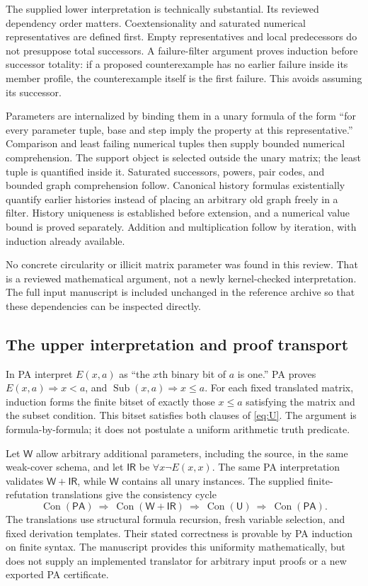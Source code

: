 \documentclass[11pt,a4paper]{article}
\theoremstyle{definition}
\newcommand{\PA}{\mathsf{PA}}
\newcommand{\U}{\mathsf{U}}
\newcommand{\W}{\mathsf{W}}
\newcommand{\IR}{\mathsf{IR}}
\newcommand{\Con}{\operatorname{Con}}
\newcommand{\Sub}{\operatorname{Sub}}
\begin{document}
The supplied lower interpretation is technically substantial. Its reviewed dependency order matters. Coextensionality and saturated numerical representatives are defined first. Empty representatives and local predecessors do not presuppose total successors. A failure-filter argument proves induction before successor totality: if a proposed counterexample has no earlier failure inside its member profile, the counterexample itself is the first failure. This avoids assuming its successor.

Parameters are internalized by binding them in a unary formula of the form ``for every parameter tuple, base and step imply the property at this representative.'' Comparison and least failing numerical tuples then supply bounded numerical comprehension. The support object is selected outside the unary matrix; the least tuple is quantified inside it. Saturated successors, powers, pair codes, and bounded graph comprehension follow. Canonical history formulas existentially quantify earlier histories instead of placing an arbitrary old graph freely in a filter. History uniqueness is established before extension, and a numerical value bound is proved separately. Addition and multiplication follow by iteration, with induction already available.

No concrete circularity or illicit matrix parameter was found in this review. That is a reviewed mathematical argument, not a newly kernel-checked interpretation. The full input manuscript is included unchanged in the reference archive so that these dependencies can be inspected directly.

\subsection{The upper interpretation and proof transport}

In PA interpret $E(x,a)$ as ``the $x$th binary bit of $a$ is one.'' PA proves $E(x,a)\Rightarrow x<a$, and $\Sub(x,a)\Rightarrow x\le a$. For each fixed translated matrix, induction forms the finite bitset of exactly those $x\le a$ satisfying the matrix and the subset condition. This bitset satisfies both clauses of \eqref{eq:U}. The argument is formula-by-formula; it does not postulate a uniform arithmetic truth predicate.

Let $\W$ allow arbitrary additional parameters, including the source, in the same weak-cover schema, and let $\IR$ be $\forall x\neg E(x,x)$. The same PA interpretation validates $\W+\IR$, while $\W$ contains all unary instances. The supplied finite-refutation translations give the consistency cycle
\[
\Con(\PA)\ \Longrightarrow\ \Con(\W+\IR)
\ \Longrightarrow\ \Con(\U)\ \Longrightarrow\ \Con(\PA).
\]
The translations use structural formula recursion, fresh variable selection, and fixed derivation templates. Their stated correctness is provable by PA induction on finite syntax. The manuscript provides this uniformity mathematically, but does not supply an implemented translator for arbitrary input proofs or a new exported PA certificate.
\end{document}
